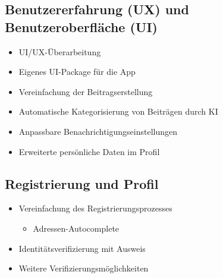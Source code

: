 \subsection{Benutzererfahrung (UX) und Benutzeroberfläche (UI)}
\begin{itemize}
  \item UI/UX-Überarbeitung
  \item Eigenes UI-Package für die App
  \item Vereinfachung der Beitragserstellung
  \item Automatische Kategorisierung von Beiträgen durch KI
  \item Anpassbare Benachrichtigungseinstellungen
  \item Erweiterte persönliche Daten im Profil
\end{itemize}

\subsection{Registrierung und Profil}
\begin{itemize}
  \item Vereinfachung des Registrierungsprozesses
        \begin{itemize}
          \item Adressen-Autocomplete
        \end{itemize}
  \item Identitätsverifizierung mit Ausweis
  \item Weitere Verifizierungsmöglichkeiten
\end{itemize}

